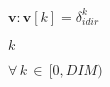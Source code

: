 \documentclass{article}
\begin{document}
$\mathbf{v}: \mathbf{v}[k] = \delta_{idir}^k$
\pagebreak

$k$
\pagebreak

$\forall\,k\,\in\,[0,DIM)$
\pagebreak
\end{document}
